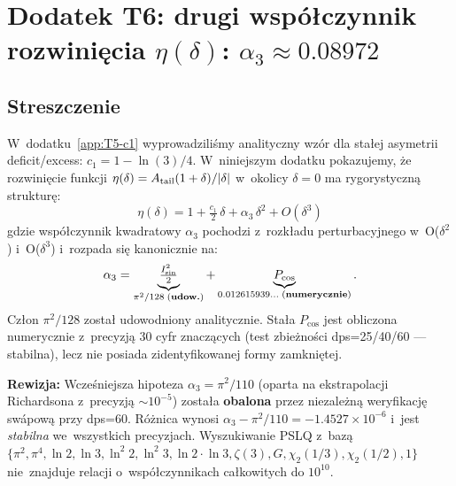 \providecommand{\Ci}{\operatorname{Ci}}
\providecommand{\Si}{\operatorname{Si}}
\providecommand{\Li}{\operatorname{Li}}

\section*{Dodatek T6: drugi wsp\'o\l{}czynnik rozwini\k{e}cia $\eta(\delta)$: $\alpha_3 \approx 0.08972$}%
%
\label{app:T6}

\subsection*{Streszczenie}

W~dodatku~\ref{app:T5-c1} wyprowadzili\'smy analityczny wz\'or dla sta\l{}ej
asymetrii deficit/excess: $c_1 = 1 - \ln(3)/4$. W~niniejszym dodatku
pokazujemy, \.ze rozwini\k{e}cie funkcji $\eta(\delta) = A_{\rm tail}(1+\delta)/|\delta|$
w~okolicy $\delta = 0$ ma rygorystyczn\k{a} struktur\k{e}:
\begin{equation}
  \boxed{\;\eta(\delta) = 1 + \tfrac{c_1}{2}\,\delta + \alpha_3\,\delta^2 + O(\delta^3)\;}
  \label{eq:eta-expansion-full}
\end{equation}
gdzie wsp\'o\l{}czynnik kwadratowy $\alpha_3$ pochodzi z~rozk\l{}adu
perturbacyjnego w~O($\delta^2$) i~O($\delta^3$) i~rozpada si\k{e} kanonicznie na:
\begin{equation}
  \alpha_3 = \underbrace{\tfrac{I_{\sin}^2}{2}}_{\pi^2/128\; \text{(\textbf{udow.})}}
           + \underbrace{P_{\cos}}_{0.012615939\ldots\;\text{(\textbf{numerycznie})}}.
  \label{eq:alpha3-decomp}
\end{equation}
Cz\l{}on $\pi^2/128$ zosta\l{} udowodniony analitycznie. Sta\l{}a $P_{\cos}$
jest obliczona numerycznie z~precyzj\k{a} 30 cyfr znacz\k{a}cych
(test zbie\.zno\'sci dps=25/40/60 --- stabilna), lecz nie posiada
zidentyfikowanej formy zamkni\k{e}tej.

\medskip
\textbf{Rewizja:} Wcze\'sniejsza hipoteza $\alpha_3 = \pi^2/110$ (oparta na
ekstrapolacji Richardsona z~precyzj\k{a} $\sim 10^{-5}$) zosta\l{}a \textbf{obalona}
przez niezale\.zn\k{a} weryfikacj\k{e} sw\'apow\k{a} przy dps=60. R\'o\.znica wynosi
$\alpha_3 - \pi^2/110 = -1.4527 \times 10^{-6}$ i~jest \emph{stabilna}
we~wszystkich precyzjach. Wyszukiwanie PSLQ z~baz\k{a}
$\{\pi^2, \pi^4, \ln 2, \ln 3, \ln^2 2, \ln^2 3, \ln 2\cdot\ln 3,
\zeta(3), G, \chi_2(1/3), \chi_2(1/2), 1\}$ nie~znajduje relacji
o~wsp\'o\l{}czynnikach ca\l{}kowitych do $10^{10}$.

